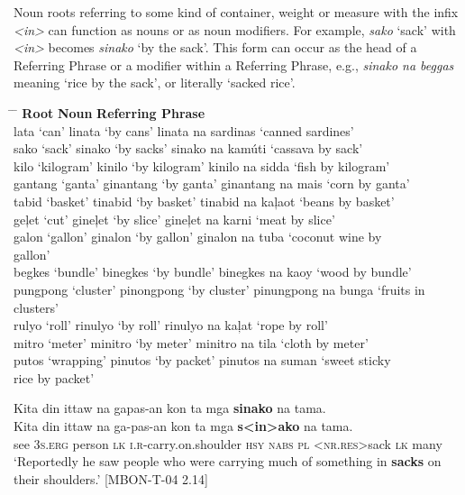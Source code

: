 Noun roots referring to some kind of container, weight or measure with the infix \textit{<in>} can function as nouns or as noun modifiers. For example, \textit{sako} ‘sack’ with \textit{<in>} becomes \textit{sinako} ‘by the sack’. This form can occur as the head of a Referring Phrase or a modifier within a Referring Phrase, e.g., \textit{sinako na beggas} meaning ‘rice by the sack’, or literally ‘sacked rice’.
\ea
\begin{tabbing}
\hspace{3cm} \= \hspace{4cm} \= \kill
\textbf{Root} \> \textbf{Noun} \> \textbf{Referring Phrase} \\
lata ‘can’ \> linata ‘by cans’ \> linata na sardinas ‘canned sardines’ \\
sako ‘sack’ \> sinako ‘by sacks’ \> sinako na kamúti ‘cassava by sack’ \\
kilo ‘kilogram’ \> kinilo ‘by kilogram’ \> kinilo na sidda ‘fish by kilogram’ \\
gantang ‘ganta’ \> ginantang ‘by ganta’\footnotemark{} \> ginantang na mais ‘corn by ganta’ \\
tabid ‘basket’ \> tinabid ‘by basket’ \> tinabid na kaļaot ‘beans by basket’ \\
geļet ‘cut’ \>  gineļet ‘by slice’ \> gineļet na karni ‘meat by slice’ \\
galon ‘gallon’ \> ginalon ‘by gallon’ \> ginalon na tuba ‘coconut wine by \\
         \> \> gallon’ \\
begkes ‘bundle’ \> binegkes ‘by bundle’ \> binegkes na kaoy ‘wood by bundle’ \\
pungpong ‘cluster’ \> pinongpong ‘by cluster’ \> pinungpong na bunga ‘fruits in \\
     \> \>   clusters’ \\
rulyo ‘roll’ \> rinulyo ‘by roll’ \> rinulyo na kaļat ‘rope by roll’ \\
mitro ‘meter’ \> minitro ‘by meter’ \> minitro na tila ‘cloth by meter’ \\
putos ‘wrapping’ \> pinutos ‘by packet’ \> pinutos na suman ‘sweet sticky \\
 \>  \>      rice by packet’
\end{tabbing}
\z
\ea
Kita  din  ittaw  na  gapas-an  kon  ta mga  \textbf{sinako}  na  tama. \\\smallskip
 \gll Kita  din  ittaw  na  ga-pas-an  kon  ta mga  \textbf{s<in>ako}  na  tama. \\
see  3\textsc{s.erg}  person  \textsc{lk}  \textsc{i.r-}carry.on.shoulder  \textsc{hsy}  \textsc{nabs} \textsc{pl}  <\textsc{nr.res}>sack  \textsc{lk}  many \\
\glt `Reportedly he saw people who were carrying much of something in \textbf{sacks} on their shoulders.’ [MBON-T-04 2.14]
\z

